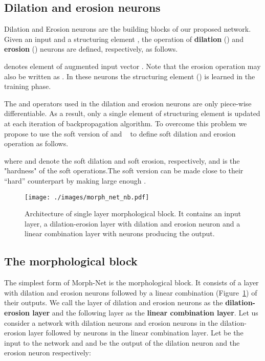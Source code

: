\documentclass[12pt]{article}
\newcommand{\newterm}[1]{{\bf #1}}
\def\Figref#1{Figure~\ref{#1}}
\begin{document}
\subsection{Dilation and erosion neurons}
\label{sec:de_neurons} 
Dilation and Erosion neurons are the building blocks of our proposed network. 
Given an input  and a structuring element , the operation of \newterm{dilation} () and \newterm{erosion} () neurons are defined, respectively, as follows.

 denotes  element of augmented input vector . 
Note that the erosion operation may also be written as . In these neurons the structuring element () is learned in the training phase.

The  and  operators used in the dilation and erosion neurons are only piece-wise differentiable. As a result,  only a single element of structuring element is updated at each iteration of backpropagation algorithm. To overcome this problem we propose to use the soft version of  and ~\cite{cook2011basic} to define soft dilation and erosion operation as follows.

where  and  denote the soft dilation and soft erosion, respectively, and  is the "hardness" of the soft operations.The soft version can be made close to their ``hard'' counterpart by making  large enough \cite{cook2011basic}. 

\begin{figure}
    \centering
    \texttt{[image: ./images/morph\_net\_nb.pdf]}   
    \caption{Architecture of single layer morphological block. It contains an input layer, a dilation-erosion layer with  dilation and  erosion neuron and a linear combination layer with  neurons producing the output.}
    \label{fig:single_layer_network}
\end{figure}

\subsection{The morphological block}
\label{sec:SL_morph}
The simplest form of Morph-Net is the morphological block. It consists of a layer with dilation and erosion neurons followed by a linear combination (\Figref{fig:single_layer_network}) of their outputs. We call the layer of dilation and erosion neurons as the \newterm{dilation-erosion layer} and the following layer as the \newterm{linear combination layer}. Let us consider a network with  dilation neurons and  erosion neurons in the dilation-erosion layer followed by  neurons in the linear combination layer. Let  be the input to the network and  and  be the output of the  dilation neuron and the  erosion neuron respectively: 
\end{document}
